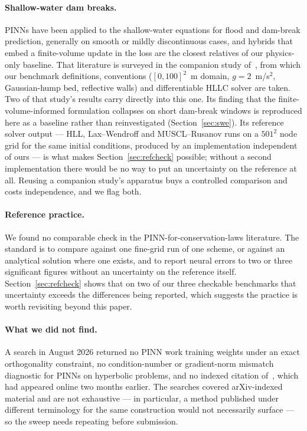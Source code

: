 \documentclass[11pt]{article}
\begin{document}
\paragraph{Shallow-water dam breaks.}
PINNs have been applied to the shallow-water equations for flood and dam-break
prediction, generally on smooth or mildly discontinuous cases, and hybrids that
embed a finite-volume update in the loss are the closest relatives of our
physics-only baseline. That literature is surveyed in the companion study
of~\cite{dambreak2026comparative}, from which our benchmark definitions,
conventions ($[0,100]^2$~m domain, $g = 2$~m/s$^2$, Gaussian-hump bed,
reflective walls) and differentiable HLLC solver are taken. Two of that study's
results carry directly into this one. Its finding that the
finite-volume-informed formulation collapses on short dam-break windows is
reproduced here as a baseline rather than reinvestigated
(Section~\ref{sec:swe}). Its reference solver output --- HLL, Lax--Wendroff and
MUSCL--Rusanov runs on a $501^2$ node grid for the same initial conditions,
produced by an implementation independent of ours --- is what makes
Section~\ref{sec:refcheck} possible; without a second implementation there
would be no way to put an uncertainty on the reference at all. Reusing a
companion study's apparatus buys a controlled comparison and costs
independence, and we flag both.

\paragraph{Reference practice.}
We found no comparable check in the PINN-for-conservation-laws literature. The
standard is to compare against one fine-grid run of one scheme, or against an
analytical solution where one exists, and to report neural errors to two or
three significant figures without an uncertainty on the reference itself.
Section~\ref{sec:refcheck} shows that on two of our three checkable benchmarks
that uncertainty exceeds the differences being reported, which suggests the
practice is worth revisiting beyond this paper.

\paragraph{What we did not find.}
A search in August 2026 returned no PINN work training weights under an exact
orthogonality constraint, no condition-number or gradient-norm mismatch
diagnostic for PINNs on hyperbolic problems, and no indexed citation
of~\cite{wang2026cnpinn}, which had appeared online two months earlier. The
searches covered arXiv-indexed material and are not exhaustive --- in
particular, a method published under different terminology for the same
construction would not necessarily surface --- so the sweep needs repeating
before submission.
\end{document}
